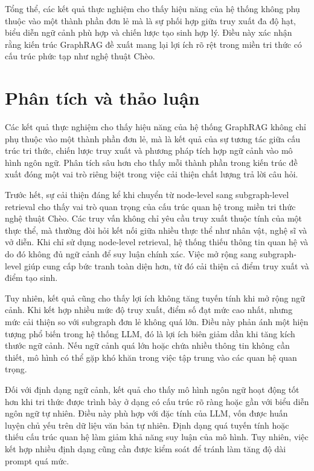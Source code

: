 Tổng thể, các kết quả thực nghiệm cho thấy hiệu năng của hệ thống không phụ thuộc vào một thành phần đơn lẻ mà là sự phối hợp giữa truy xuất đa độ hạt, biểu diễn ngữ cảnh phù hợp và chiến lược tạo sinh hợp lý. Điều này xác nhận rằng kiến trúc GraphRAG đề xuất mang lại lợi ích rõ rệt trong miền tri thức có cấu trúc phức tạp như nghệ thuật Chèo.

\section{Phân tích và thảo luận}

Các kết quả thực nghiệm cho thấy hiệu năng của hệ thống GraphRAG không chỉ phụ thuộc vào một thành phần đơn lẻ, mà là kết quả của sự tương tác giữa cấu trúc tri thức, chiến lược truy xuất và phương pháp tích hợp ngữ cảnh vào mô hình ngôn ngữ. Phân tích sâu hơn cho thấy mỗi thành phần trong kiến trúc đề xuất đóng một vai trò riêng biệt trong việc cải thiện chất lượng trả lời câu hỏi.

Trước hết, sự cải thiện đáng kể khi chuyển từ node-level sang subgraph-level retrieval cho thấy vai trò quan trọng của cấu trúc quan hệ trong miền tri thức nghệ thuật Chèo. Các truy vấn không chỉ yêu cầu truy xuất thuộc tính của một thực thể, mà thường đòi hỏi kết nối giữa nhiều thực thể như nhân vật, nghệ sĩ và vở diễn. Khi chỉ sử dụng node-level retrieval, hệ thống thiếu thông tin quan hệ và do đó không đủ ngữ cảnh để suy luận chính xác. Việc mở rộng sang subgraph-level giúp cung cấp bức tranh toàn diện hơn, từ đó cải thiện cả điểm truy xuất và điểm tạo sinh.

Tuy nhiên, kết quả cũng cho thấy lợi ích không tăng tuyến tính khi mở rộng ngữ cảnh. Khi kết hợp nhiều mức độ truy xuất, điểm số đạt mức cao nhất, nhưng mức cải thiện so với subgraph đơn lẻ không quá lớn. Điều này phản ánh một hiện tượng phổ biến trong hệ thống LLM, đó là lợi ích biên giảm dần khi tăng kích thước ngữ cảnh. Nếu ngữ cảnh quá lớn hoặc chứa nhiều thông tin không cần thiết, mô hình có thể gặp khó khăn trong việc tập trung vào các quan hệ quan trọng.

Đối với định dạng ngữ cảnh, kết quả cho thấy mô hình ngôn ngữ hoạt động tốt hơn khi tri thức được trình bày ở dạng có cấu trúc rõ ràng hoặc gần với biểu diễn ngôn ngữ tự nhiên. Điều này phù hợp với đặc tính của LLM, vốn được huấn luyện chủ yếu trên dữ liệu văn bản tự nhiên. Định dạng quá tuyến tính hoặc thiếu cấu trúc quan hệ làm giảm khả năng suy luận của mô hình. Tuy nhiên, việc kết hợp nhiều định dạng cũng cần được kiểm soát để tránh làm tăng độ dài prompt quá mức.

